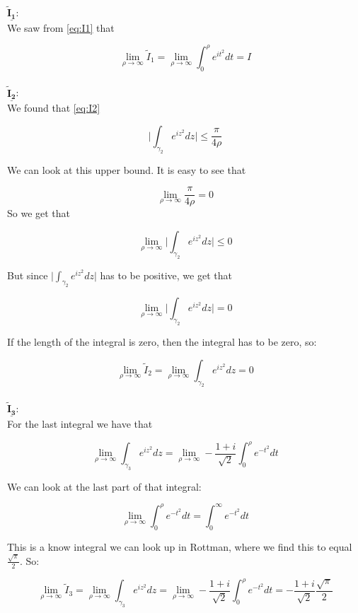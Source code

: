 \documentclass[a4paper,norsk, 10pt]{article}
\begin{document}
$\underline{\mathbf{\tilde{I}_1}}$:\\

We saw from \ref{eq:I1} that

\begin{equation}
\lim_{\rho \rightarrow \infty} \tilde{I}_1 = \lim_{\rho \rightarrow \infty} \int_0^{\rho} e^{it^2} dt = I
\label{eq:I1rhoInf}
\end{equation}\\

$\underline{\mathbf{\tilde{I}_2}}$:\\

We found that \ref{eq:I2}

$$
\bigg|\int_{\gamma_2}e^{iz^2}dz \bigg| \leq \frac{\pi}{4\rho}
$$

We can look at this upper bound. It is easy to see that

$$
\lim_{\rho\rightarrow \infty} \frac{\pi}{4\rho} = 0
$$
So we get that

$$
\lim_{\rho \rightarrow \infty } \bigg|\int_{\gamma_2}e^{iz^2}dz \bigg| \leq 0
$$

But since $\big|\int_{\gamma_2}e^{iz^2}dz \big|$ has to be positive, we get that

$$
\lim_{\rho \rightarrow \infty } \bigg|\int_{\gamma_2}e^{iz^2}dz \bigg| = 0
$$

If the length of the integral is zero, then the integral has to be zero, so:

\begin{equation}
\lim_{\rho \rightarrow \infty} \tilde{I}_2 = \lim_{\rho \rightarrow \infty}  \int_{\gamma_2}e^{iz^2}dz = 0
\label{I2rhoInf}
\end{equation}\\

$\underline{\mathbf{\tilde{I}_3}}$:\\

For the last integral we have that 

$$
\lim_{\rho \rightarrow \infty}  \int_{\gamma_3}e^{iz^2}dz = \lim_{\rho \rightarrow \infty} -\frac{1+i}{\sqrt{2}}  \int_0^{\rho}e^{-t^2}dt 
$$

We can look at the last part of that integral:

$$
\lim_{\rho \rightarrow \infty} \int_0^{\rho}e^{-t^2}dt  = \int_0^{\infty}e^{-t^2}dt
$$

This is a know integral we can look up in Rottman, where we find this to equal $\frac{\sqrt{\pi}}{2}$. So:

\begin{equation}
\lim_{\rho \rightarrow \infty} \tilde{I}_3 = \lim_{\rho \rightarrow \infty} \int_{\gamma_3}e^{iz^2}dz = \lim_{\rho \rightarrow \infty} -\frac{1+i}{\sqrt{2}}  \int_0^{\rho}e^{-t^2}dt = -\frac{1+i}{\sqrt{2}} \frac{\sqrt{\pi}}{2}
\label{I3rhoinf}
\end{equation}\\
\end{document}
